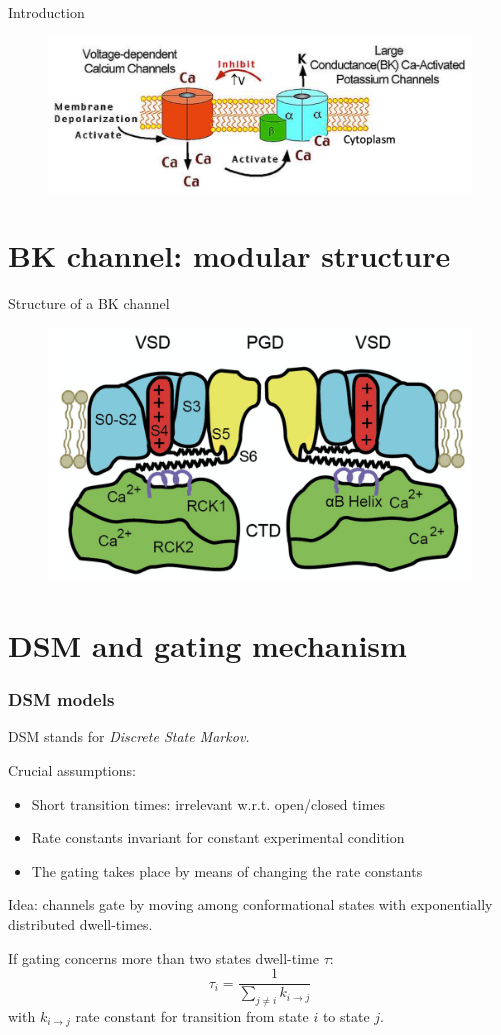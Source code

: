 \documentclass{beamer}
\begin{document}
\begin{frame}{Introduction}
\begin{figure}
\centering
\includegraphics[width=.8\textwidth]{Feedback_Mechanism.png}
\end{figure}
\end{frame}

\section{BK channel: modular structure}

\begin{frame}{Structure of a BK channel}
\begin{figure}
\centering
\includegraphics[width=.8\textwidth]{BK_Cartoon.png}
\end{figure}
\hfill
\end{frame}

\section{DSM and gating mechanism}
\begin{frame}[t]\frametitle{DSM models}
    DSM stands for \emph{Discrete State Markov.}

	Crucial assumptions:
	\begin{itemize}
    	\item Short transition times: irrelevant w.r.t. open/closed times
    	\item Rate constants invariant for constant experimental condition
    	\item The gating takes place by means of changing the rate constants
    \end{itemize}

    Idea: channels gate by moving among conformational states with exponentially distributed dwell-times.

    If gating concerns more than two states dwell-time $\tau:$
    \[
    \tau_i = \frac{1}{\sum_{j\neq i} k_{i\rightarrow j}}
    \]
    with $k_{i\rightarrow j}$ rate constant for transition from state $i$ to state $j.$




\end{frame}
\end{document}
